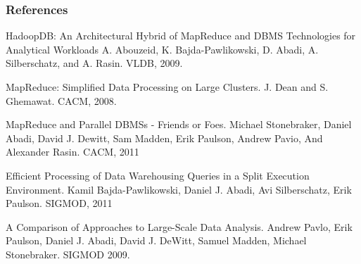 \documentclass{beamer}
\begin{document}

\begin{frame}
  \frametitle{References}
  \begin{enumerate}
{\small{
  \item HadoopDB: An Architectural Hybrid of MapReduce and
    DBMS Technologies for Analytical Workloads A. Abouzeid, K. Bajda-Pawlikowski, D. Abadi, A. Silberschatz, and A. Rasin. VLDB, 2009.
  \item MapReduce: Simplified Data Processing
    on Large Clusters. J. Dean and S. Ghemawat. CACM, 2008.
  \item MapReduce and
    Parallel DBMSs -  Friends or Foes. Michael Stonebraker, Daniel
    Abadi, David J. Dewitt, Sam Madden, Erik Paulson, Andrew Pavio, And Alexander Rasin. CACM, 2011
  \item Efficient Processing of Data Warehousing Queries
    in a Split Execution Environment. Kamil Bajda-Pawlikowski, Daniel J. Abadi, Avi Silberschatz,
    Erik Paulson. SIGMOD, 2011
  \item A Comparison of Approaches to Large-Scale Data
    Analysis. Andrew Pavlo, 
    Erik Paulson, Daniel J. Abadi, David J. DeWitt, Samuel Madden, Michael
    Stonebraker. SIGMOD 2009.}}
\end{enumerate}
\end{frame}

\end{document}
